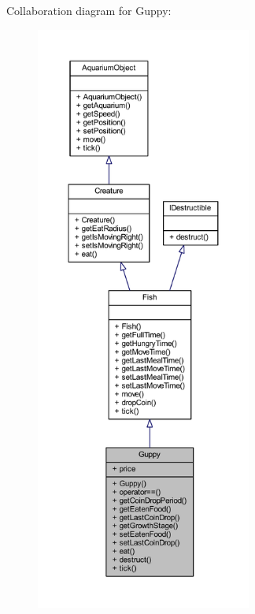 Collaboration diagram for Guppy\+:\nopagebreak
\begin{figure}[H]
\begin{center}
\leavevmode
\includegraphics[height=550pt]{class_guppy__coll__graph}
\end{center}
\end{figure}
